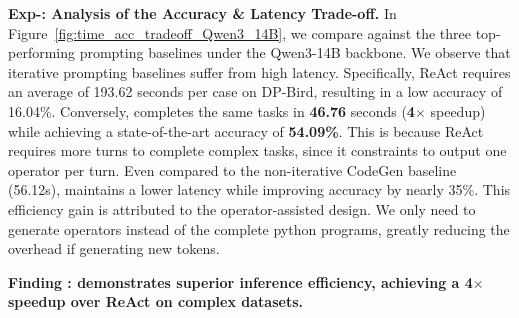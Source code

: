 \noindent \textbf{Exp-\expnum\label{exp:acc_time_tradeoff}: Analysis of the Accuracy \& Latency Trade-off.}
In Figure~\ref{fig:time_acc_tradeoff_Qwen3_14B}, we compare \sys against the three top-performing prompting baselines under the Qwen3-14B backbone.
We observe that iterative prompting baselines suffer from high latency.
Specifically, ReAct requires an average of {193.62} seconds per case on DP-Bird, resulting in a low accuracy of 16.04\%.
Conversely, \sys completes the same tasks in \textbf{46.76} seconds (\textbf{4$\times$} speedup) while achieving a state-of-the-art accuracy of \textbf{54.09\%}.
This is because ReAct requires more turns to complete complex tasks, since it constraints to output one operator per turn.
Even compared to the non-iterative CodeGen baseline (56.12s), \sys maintains a lower latency while improving accuracy by nearly 35\%.
This efficiency gain is attributed to the operator-assisted design. We only need to generate operators instead of the complete python programs, greatly reducing the overhead if generating new tokens.

\begin{shaded}
\noindent \textbf{Finding \findingnum: \sys demonstrates superior inference efficiency, achieving a 4$\times$ speedup over ReAct on complex datasets.}
\end{shaded}